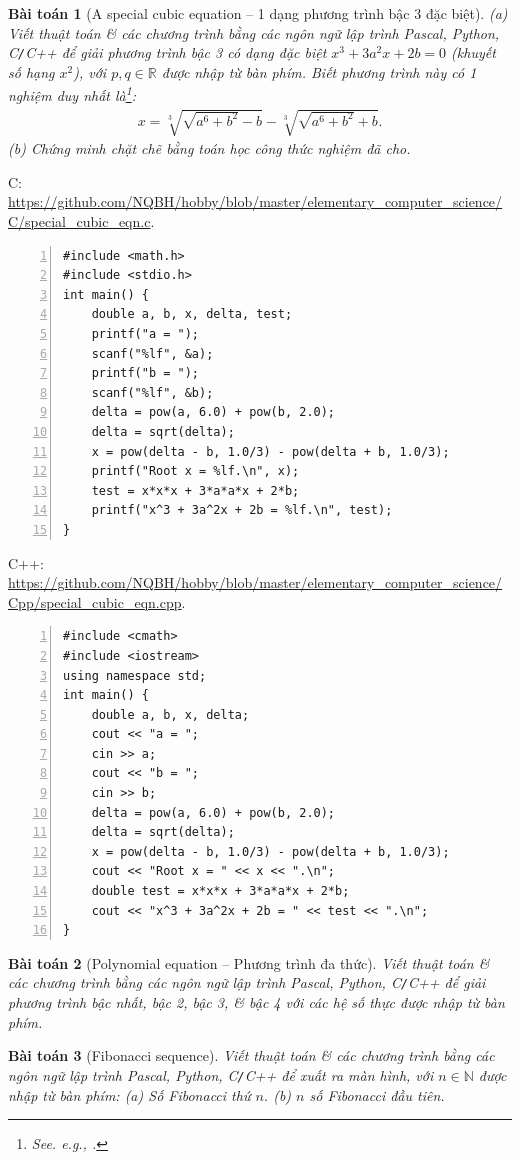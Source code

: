 \documentclass{article}
\newtheorem{baitoan}{Bài toán}
\begin{document}
\begin{baitoan}[A special cubic equation -- 1 dạng phương trình bậc 3 đặc biệt]
	(a) Viết thuật toán \& các chương trình bằng các ngôn ngữ lập trình {\sf Pascal, Python, C{\tt /}C++} để giải phương trình bậc 3 có dạng đặc biệt $x^3 + 3a^2x + 2b = 0$ (khuyết số hạng $x^2$), với $p,q\in\mathbb{R}$ được nhập từ bàn phím. Biết phương trình này có 1 nghiệm duy nhất là\footnote{See. e.g., \cite[pp. 68--69]{Thu_Phuong_Tien_Triet_NMLT}.}:
	\begin{align*}
		x = \sqrt[3]{\sqrt{a^6 + b^2} - b} - \sqrt[3]{\sqrt{a^6 + b^2} + b}.
	\end{align*}
	(b) Chứng minh chặt chẽ bằng toán học công thức nghiệm đã cho.
\end{baitoan}
C: \url{https://github.com/NQBH/hobby/blob/master/elementary_computer_science/C/special_cubic_eqn.c}.
\begin{Verbatim}[numbers=left,xleftmargin=5mm]
#include <math.h>
#include <stdio.h>
int main() {
    double a, b, x, delta, test;
    printf("a = ");
    scanf("%lf", &a);
    printf("b = ");
    scanf("%lf", &b);
    delta = pow(a, 6.0) + pow(b, 2.0);
    delta = sqrt(delta);
    x = pow(delta - b, 1.0/3) - pow(delta + b, 1.0/3);
    printf("Root x = %lf.\n", x);
    test = x*x*x + 3*a*a*x + 2*b;
    printf("x^3 + 3a^2x + 2b = %lf.\n", test);
}
\end{Verbatim}
C++: \url{https://github.com/NQBH/hobby/blob/master/elementary_computer_science/Cpp/special_cubic_eqn.cpp}.
\begin{Verbatim}[numbers=left,xleftmargin=5mm]
#include <cmath>
#include <iostream>
using namespace std;
int main() {
    double a, b, x, delta;
    cout << "a = ";
    cin >> a;
    cout << "b = ";
    cin >> b;
    delta = pow(a, 6.0) + pow(b, 2.0);
    delta = sqrt(delta);
    x = pow(delta - b, 1.0/3) - pow(delta + b, 1.0/3);
    cout << "Root x = " << x << ".\n";
    double test = x*x*x + 3*a*a*x + 2*b;
    cout << "x^3 + 3a^2x + 2b = " << test << ".\n";
}
\end{Verbatim}

\begin{baitoan}[Polynomial equation -- Phương trình đa thức]
	Viết thuật toán \& các chương trình bằng các ngôn ngữ lập trình {\sf Pascal, Python, C{\tt /}C++} để giải phương trình bậc nhất, bậc 2, bậc 3, \& bậc 4 với các hệ số thực được nhập từ bàn phím.
\end{baitoan}

\begin{baitoan}[Fibonacci sequence]
	Viết thuật toán \& các chương trình bằng các ngôn ngữ lập trình {\sf Pascal, Python, C{\tt /}C++} để xuất ra màn hình, với $n\in\mathbb{N}$ được nhập từ bàn phím: (a) Số Fibonacci thứ $n$. (b) $n$ số Fibonacci đầu tiên.
\end{baitoan}
\end{document}
